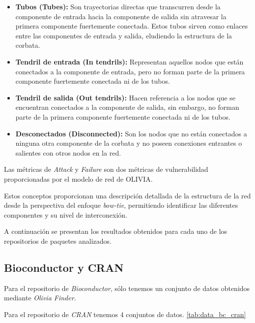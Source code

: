 \begin{itemize}
    \item \textbf{Tubos (Tubes):} Son trayectorias directas que transcurren desde la componente de entrada hacia la componente de salida sin atravesar la primera componente fuertemente conectada. Estos tubos sirven como enlaces entre las componentes de entrada y salida, eludiendo la estructura de la corbata.

    \item \textbf{Tendril de entrada (In tendrils):} Representan aquellos nodos que están conectados a la componente de entrada, pero no forman parte de la primera componente fuertemente conectada ni de los tubos.

    \item \textbf{Tendril de salida (Out tendrils):} Hacen referencia a los nodos que se encuentran conectados a la componente de salida, sin embargo, no forman parte de la primera componente fuertemente conectada ni de los tubos.

    \item \textbf{Desconectados (Disconnected):} Son los nodos que no están conectados a ninguna otra componente de la corbata y no poseen conexiones entrantes o salientes con otros nodos en la red.

\end{itemize}

Las métricas de \textit{Attack} y \textit{Failure} son dos métricas de vulnerabilidad proporcionadas por el modelo de red de OLIVIA. \cite{Seto-Rey20231}

Estos conceptos proporcionan una descripción detallada de la estructura de la red desde la perspectiva del enfoque \textit{bow-tie}, permitiendo identificar las diferentes componentes y su nivel de interconexión.

A continuación se presentan los resultados obtenidos para cada uno de los repositorios de paquetes analizados.

\subsection{Bioconductor y CRAN}

Para el repositorio de \textit{Bioconductor}, sólo tenemos un conjunto de datos obtenidos mediante \textit{Olivia Finder}.

Para el repositorio de \textit{CRAN} tenemos 4 conjuntos de datos. \ref{tab:data_bc_cran}

